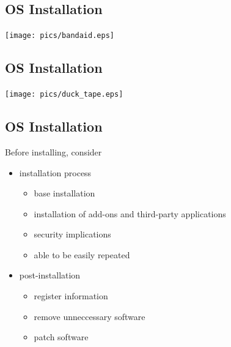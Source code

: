 \documentclass[xga]{xdvislides}
\begin{document}
\subsection{OS Installation}
\vspace*{\fill}
\begin{center}
	\texttt{[image: pics/bandaid.eps]}
\end{center}
\vspace*{\fill}

\subsection{OS Installation}
\vspace*{\fill}
\begin{center}
	\texttt{[image: pics/duck\_tape.eps]}
\end{center}
\vspace*{\fill}


\subsection{OS Installation}
Before installing, consider
\begin{itemize}
	\item installation process
		\begin{itemize}
			\item base installation
			\item installation of add-ons and third-party applications
			\item security implications
			\item able to be easily repeated
		\end{itemize}
	\item post-installation
		\begin{itemize}
			\item register information
			\item remove unneccessary software
			\item patch software
		\end{itemize}
\end{itemize}
\end{document}
